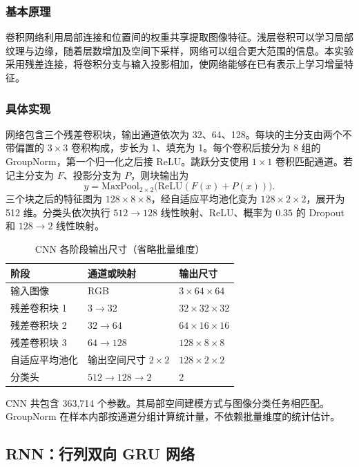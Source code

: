 \documentclass[UTF8,a4paper,zihao=-4,fontset=fandol]{ctexart}
\begin{document}
\subsubsection{基本原理}
卷积网络利用局部连接和位置间的权重共享提取图像特征。浅层卷积可以学习局部纹理与边缘，随着层数增加及空间下采样，网络可以组合更大范围的信息。本实验采用残差连接，将卷积分支与输入投影相加，使网络能够在已有表示上学习增量特征。

\subsubsection{具体实现}
网络包含三个残差卷积块，输出通道依次为 32、64、128。每块的主分支由两个不带偏置的 $3\times3$ 卷积构成，步长为 1、填充为 1。每个卷积后接分为 8 组的 GroupNorm，第一个归一化之后接 ReLU。跳跃分支使用 $1\times1$ 卷积匹配通道。若记主分支为 $F$、投影分支为 $P$，则块输出为
\begin{equation}
 y=\mathrm{MaxPool}_{2\times2}\bigl(\mathrm{ReLU}(F(x)+P(x))\bigr).
\end{equation}
三个块之后的特征图为 $128\times8\times8$，经自适应平均池化变为 $128\times2\times2$，展开为 512 维。分类头依次执行 $512\rightarrow128$ 线性映射、ReLU、概率为 $0.35$ 的 Dropout 和 $128\rightarrow2$ 线性映射。

\begin{table}[htbp]
\centering\small
\caption{CNN 各阶段输出尺寸（省略批量维度）}
\begin{tabular}{lll}
\toprule
阶段 & 通道或映射 & 输出尺寸\\
\midrule
输入图像 & RGB & $3\times64\times64$\\
残差卷积块 1 & $3\rightarrow32$ & $32\times32\times32$\\
残差卷积块 2 & $32\rightarrow64$ & $64\times16\times16$\\
残差卷积块 3 & $64\rightarrow128$ & $128\times8\times8$\\
自适应平均池化 & 输出空间尺寸 $2\times2$ & $128\times2\times2$\\
分类头 & $512\rightarrow128\rightarrow2$ & $2$\\
\bottomrule
\end{tabular}
\end{table}

CNN 共包含 363,714 个参数。其局部空间建模方式与图像分类任务相匹配。GroupNorm 在样本内部按通道分组计算统计量，不依赖批量维度的统计估计。

\subsection{RNN：行列双向 GRU 网络}
\end{document}
